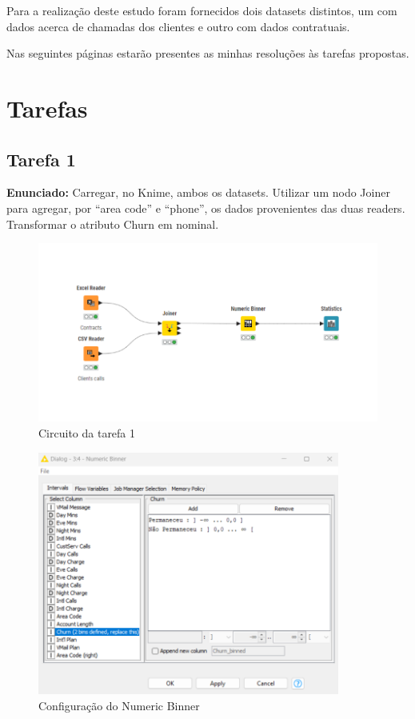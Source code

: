 \documentclass[a4paper, 12pt]{article}
\begin{document}
Para a realização deste estudo foram fornecidos dois datasets distintos, um com dados acerca de chamadas dos clientes e outro com dados contratuais.  

Nas seguintes páginas estarão presentes as minhas resoluções às tarefas propostas.
\newpage


\section{Tarefas}
\subsection{Tarefa 1}

\textbf{Enunciado:} Carregar, no Knime, ambos os datasets. Utilizar um nodo Joiner para agregar, por “area code” e “phone”, os dados provenientes das duas readers. Transformar o atributo Churn em nominal.  

\begin{figure}[h]
    \centering
    \includegraphics[scale=0.6]{T1/P1-leitura.png}
    \caption{Circuito da tarefa 1}
    \label{fig:enter-label}
\end{figure}

\begin{figure}[h]
    \centering
    \includegraphics[height=8cm]{T1/P1-Binner.png}
    \caption{Configuração do Numeric Binner}
    \label{fig:enter-label}
\end{figure}
\end{document}
